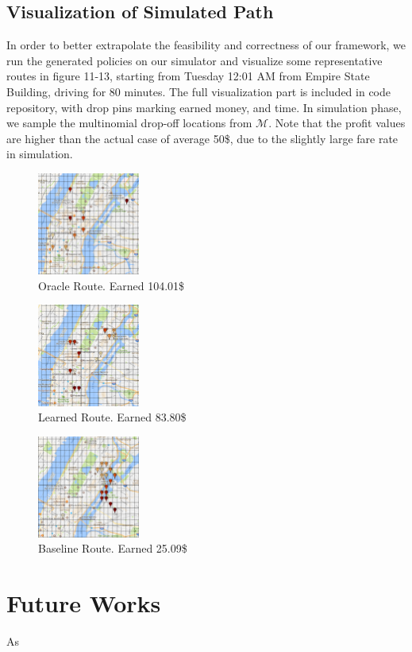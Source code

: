 \documentclass[letterpaper, 10 pt, conference]{ieeeconf}
\begin{document}
\subsection{Visualization of Simulated Path}
In order to better extrapolate the feasibility and correctness of our framework, we run the generated policies on our simulator and visualize some representative routes in figure 11-13, starting from Tuesday 12:01 AM from Empire State Building, driving for 80 minutes. The full visualization part is included in  code repository, with drop pins marking earned money, and time. In simulation phase, we sample the multinomial drop-off locations from $\mathcal{M}$. Note that the profit values are  higher than the actual case of average 50\$, due to the slightly large fare rate in simulation.
\begin{figure}
\centering
\includegraphics[width=0.3\textwidth]{oracle.png}
\caption{Oracle Route. Earned 104.01\$}
\end{figure}
\begin{figure}
\centering
\includegraphics[width=0.3\textwidth]{learned.png}
\caption{Learned Route. Earned 83.80\$}
\end{figure}
\begin{figure}
\centering
\includegraphics[width=0.3\textwidth]{baseline.png}
\caption{Baseline Route. Earned 25.09\$}
\end{figure}
\section{Future Works}
As 

% 
\end{document}
